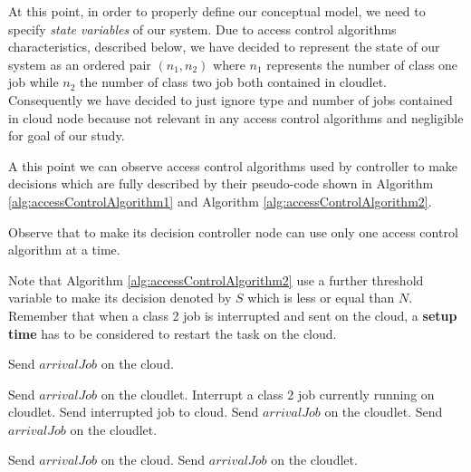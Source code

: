 \documentclass[10pt,a4paper]{article}
\begin{document}
At this point, in order to properly define our conceptual model, we need to specify \textit{state variables} of our system. 
Due to access control algorithms characteristics, described below, we have decided to represent the state of our system as an ordered pair $(n_1, n_2)$ where $n_1$ represents the number of class one job while $n_2$ the number of class two job both contained in cloudlet. Consequently we have decided to just ignore type and number of jobs contained in cloud node because not relevant in any access control algorithms and negligible for goal of our study. 

A this point we can observe access control algorithms used by controller to make decisions which are fully described by their pseudo-code shown in Algorithm \ref{alg:accessControlAlgorithm1} and Algorithm \ref{alg:accessControlAlgorithm2}. 

Observe that to make its decision controller node can use only one access control algorithm at a time. 

Note that Algorithm \ref{alg:accessControlAlgorithm2} use a further threshold variable to make its decision denoted by $S$ which is less or equal than $N$. Remember that when a class 2 job is interrupted and sent on the cloud, a \textbf{ setup time} has to be considered to restart the task on the cloud. 

\begin{algorithm}[h]
\caption{}\label{alg:accessControlAlgorithm2}
\begin{algorithmic}[h!]




	\State Send $\textit{arrivalJob}$ on the cloud.

	\State Send $\textit{arrivalJob}$ on the cloudlet.
	\State Interrupt a class 2 job currently running on cloudlet.
	\State Send interrupted job to cloud.
	\State Send $\textit{arrivalJob}$ on the cloudlet.
\Else 	
 	\State Send $\textit{arrivalJob}$ on the cloudlet.
\EndIf



\Else 

	\State Send $\textit{arrivalJob}$ on the cloud.
\Else 	
 	\State Send $\textit{arrivalJob}$ on the cloudlet.
\EndIf

\EndIf

\EndFunction

\end{algorithmic}
\end{algorithm}
\end{document}
